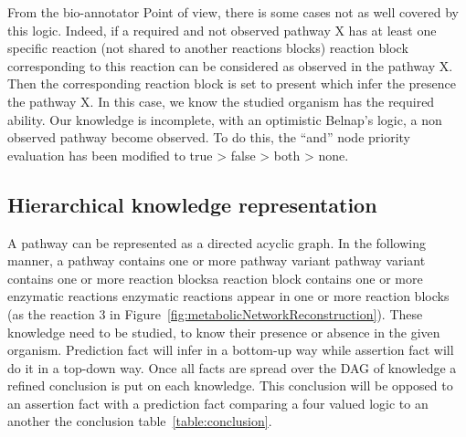\documentclass{llncs}
\begin{document}
From the bio-annotator Point of view, there is some cases not as well covered by this logic. Indeed, if a required and not observed pathway X has at least one specific reaction (not shared to another reactions blocks) reaction block corresponding to this reaction can be considered as observed in the pathway X. Then the corresponding reaction block is set to present which infer the presence  the pathway X. In this case, we know the studied organism has the required ability. Our knowledge is incomplete, with an optimistic Belnap's logic, a non observed pathway become observed. To do this, the ``and'' node priority evaluation has been modified  to true > false > both > none.

\subsection{Hierarchical knowledge representation}
A pathway can be represented  as a directed acyclic graph. In the following manner, a pathway contains one or more pathway variant pathway variant contains one or more reaction blocksa reaction block contains one or more enzymatic reactions  enzymatic reactions appear in one or more reaction blocks (as the reaction 3 in Figure~\ref{fig:metabolicNetworkReconstruction}). These knowledge need to be studied, to know their presence or absence in the given organism. Prediction fact will infer in a bottom-up way while assertion fact will do it in a top-down way. Once all facts are spread over the DAG of knowledge a refined conclusion is put on each knowledge. This conclusion will be opposed to an assertion fact with a prediction fact comparing a four valued logic to an another  the conclusion table~\ref{table:conclusion}.
\end{document}
